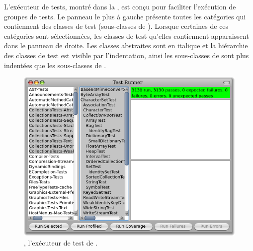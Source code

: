 \documentclass[a4paper,10pt,twoside]{book}
\begin{document}
L'exécuteur de tests, montré dans la , est conçu pour faciliter 
l'exécution de groupes de tests.
Le panneau le plus à gauche présente toutes les catégories qui
contiennent des classes de test (\ie  sous-classes de
). Lorsque certaines de ces catégories sont
sélectionnées, les classes de test qu'elles contiennent apparaissent
dans le panneau de droite.
Les classes abstraites sont en italique et la hiérarchie des classes de test est visible par l'indentation, ainsi les sous-classes de   sont plus indentées que les sous-classes de .

\begin{figure}[tbh]
  \begin{center}
	\includegraphics[width=\linewidth]{test-runner}
	\caption{\sunit, l'exécuteur de test de \pharo.}
  \end{center}
\end{figure}



\end{document}
